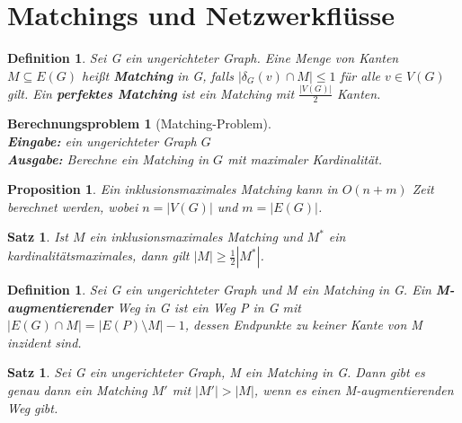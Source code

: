 \documentclass[12pt,a4paper]{article}
\theoremstyle{plain}
\newtheorem{Satz}[Theorem]{Satz}
\newtheorem{Prop}[Theorem]{Proposition}
\newtheorem{Definition}[Theorem]{Definition}
\newtheorem{Berechnungsproblem}[Theorem]{Berechnungsproblem}
\newcommand{\herv}[1]{{\emph{\textbf{#1}}}}
\numberwithin{equation}{section}
\begin{document}
\section{Matchings und Netzwerkflüsse}
\begin{Definition}
Sei G ein ungerichteter Graph. Eine Menge von Kanten $M\subseteq E(G)$ heißt \herv{Matching} in G, falls $|\delta_{G}(v)\cap M|\leq 1$ für alle $v \in V(G)$ gilt. Ein \herv{perfektes Matching} ist ein Matching mit $\frac{|V(G)|}{2}$ Kanten.
\end{Definition}
\begin{Berechnungsproblem}[Matching-Problem]\\
\textbf{Eingabe:} ein ungerichteter Graph $G$\\
\textbf{Ausgabe:} Berechne ein Matching in $G$ mit maximaler Kardinalität.
\end{Berechnungsproblem}
\begin{Prop}
Ein inklusionsmaximales Matching kann in $O(n+m)$ Zeit berechnet werden, wobei $n=|V(G)|$ und $m=|E(G)|$.
\end{Prop}
\begin{Satz}
Ist $M$ ein inklusionsmaximales Matching und $M^{*}$ ein kardinalitätsmaximales, dann gilt $|M|\geq \frac{1}{2} |M^ {*}|$.
\end{Satz}
\begin{Definition}
Sei G ein ungerichteter Graph und M ein Matching in G. Ein \herv{M-aug\-men\-tie\-ren\-der} Weg in G ist ein Weg P in G mit $|E(G)\cap M|=|E(P)\setminus M|-1$, dessen Endpunkte zu keiner Kante von M inzident sind.
\end{Definition}
\begin{Satz}
Sei G ein ungerichteter Graph, M ein Matching in G. Dann gibt es genau dann ein Matching $M'$ mit $|M'|>|M|$, wenn es einen M-augmentierenden Weg gibt.
\end{Satz}
\end{document}
